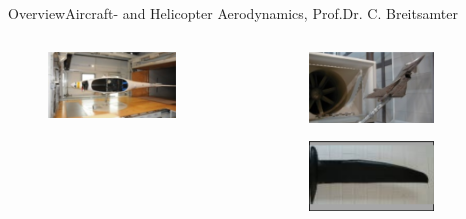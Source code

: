 \documentclass[AERbeamer%
              ,optEnglish%
              ,optBiber%
              ,optBibstyleAlphabetic%
              ,optBeamerClassicFormat%
              ]{AERlatex}%
\begin{document}
\begin{frame}[c]{Overview}{Aircraft- and Helicopter Aerodynamics, Prof.Dr. C. Breitsamter}
\begin{columns}[T]
\begin{column}{0.33\textwidth}
\begin{figure}
            \end{figure}
            \begin{figure}
                \centering
                \includegraphics[width=0.8\textwidth]{Breitsamter3.png}
            \end{figure}
        \end{column}
        \begin{column}{0.33\textwidth}
            \begin{figure}
                \centering
                \includegraphics[width=0.77\textwidth]{Breitsamter4.png}
            \end{figure}
            \begin{figure}
                \centering
                \includegraphics[width=0.77\textwidth]{Breitsamter5.png}
            \end{figure}

\end{column}
\end{columns}
\end{frame}
\end{document}
